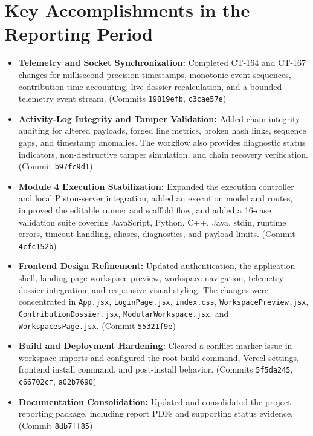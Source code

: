 \documentclass[11pt,a4paper]{article}
\begin{document}
\section{Key Accomplishments in the Reporting Period}

\begin{itemize}
    \item \textbf{Telemetry and Socket Synchronization:} Completed CT-164 and CT-167 changes for millisecond-precision timestamps, monotonic event sequences, contribution-time accounting, live dossier recalculation, and a bounded telemetry event stream. (Commits \texttt{19819efb}, \texttt{c3cae57e})

    \item \textbf{Activity-Log Integrity and Tamper Validation:} Added chain-integrity auditing for altered payloads, forged line metrics, broken hash links, sequence gaps, and timestamp anomalies. The workflow also provides diagnostic status indicators, non-destructive tamper simulation, and chain recovery verification. (Commit \texttt{b97fc9d1})

    \item \textbf{Module 4 Execution Stabilization:} Expanded the execution controller and local Piston-server integration, added an execution model and routes, improved the editable runner and scaffold flow, and added a 16-case validation suite covering JavaScript, Python, C++, Java, stdin, runtime errors, timeout handling, aliases, diagnostics, and payload limits. (Commit \texttt{4cfc152b})

    \item \textbf{Frontend Design Refinement:} Updated authentication, the application shell, landing-page workspace preview, workspace navigation, telemetry dossier integration, and responsive visual styling. The changes were concentrated in \texttt{App.jsx}, \texttt{LoginPage.jsx}, \texttt{index.css}, \texttt{WorkspacePreview.jsx}, \texttt{ContributionDossier.jsx}, \texttt{ModularWorkspace.jsx}, and \texttt{WorkspacesPage.jsx}. (Commit \texttt{55321f9e})

    \item \textbf{Build and Deployment Hardening:} Cleared a conflict-marker issue in workspace imports and configured the root build command, Vercel settings, frontend install command, and post-install behavior. (Commits \texttt{5f5da245}, \texttt{c66702cf}, \texttt{a02b7690})

    \item \textbf{Documentation Consolidation:} Updated and consolidated the project reporting package, including report PDFs and supporting status evidence. (Commit \texttt{8db7ff85})
\end{itemize}
\end{document}
